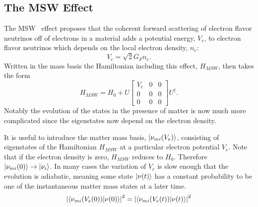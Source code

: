 \subsection{The MSW Effect}

The MSW~\cite{wolfenstein,mikheyev} effect proposes that the coherent forward scattering of electron flavor neutrinos off of electrons in a material adds a potential energy, $V_e$, to electron flavor neutrinos which depends on the local electron density, $n_e$:
\begin{equation}
V_e = \sqrt{2} G_F n_e.
\end{equation}
Written in the mass basis the Hamiltonian including this effect, $H_{MSW}$, then takes the form
\begin{equation}
H_{MSW} = H_{0} + U\begin{bmatrix}
V_e & 0 & 0 \\
0 & 0 & 0 \\
0 & 0 & 0
\end{bmatrix}U^\dagger.
\end{equation}
Notably the evolution of the states in the presence of matter is now much more complicated since the eigenstates now depend on the electron density.

It is useful to introduce the matter mass basis, $\ket{\nu_{mi}(V_e)}$, consisting of eigenstates of the Hamiltonian $H_{MSW}$ at a particular electron potential $V_e$.
Note that if the electron density is zero, $H_{MSW}$ reduces to $H_0$. Therefore $\ket{\nu_{mi}(0)} \rightarrow \ket{\nu_{i}}$.
In many cases the variation of $V_e$ is slow enough that the evolution is adiabatic, meaning some state $\ket{\nu(t)}$ has a constant probability to be one of the instantaneous matter mass states at a later time. 
\begin{equation}
\left| \braket{\nu_{mi}(V_e(0))}{\nu(0)} \right|^2 = \left| \braket{\nu_{mi}(V_e(t))}{\nu(t)} \right |^2
\end{equation}

